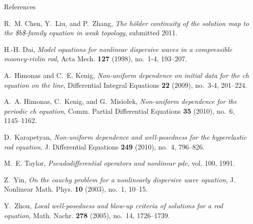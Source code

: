 \documentclass{beamer}
\numberwithin{equation}{section}
\begin{document}





\providecommand{\bysame}{\leavevmode\hbox to3em{\hrulefill}\thinspace}
\providecommand{\MR}{\relax\ifhmode\unskip\space\fi MR }
\providecommand{\MRhref}[2]{%
  \href{http://www.ams.org/mathscinet-getitem?mr=#1}{#2}
}
\providecommand{\href}[2]{#2}
\begin{frame}[allowframebreaks]{References} 
\begin{thebibliography}{HKM10}

R.~M. Chen, Y.~Liu, and P.~Zhang, \emph{The h{\"o}lder continuity of the
  solution map to the {\$}b{\$}-family equation in weak topology}, submitted 2011.

H.-H. Dai, \emph{Model equations for nonlinear dispersive waves in a
  compressible mooney-rivlin rod}, Acta Mech. \textbf{127} (1998), no.~1-4,
  193--207.

A.~Himonas and C.~E. Kenig, \emph{Non-uniform dependence on initial data for
  the ch equation on the line}, Differential Integral Equations \textbf{22}
  (2009), no.~3-4, 201--224.

A.~A. Himonas, C.~Kenig, and G.~Misio{\l}ek, \emph{Non-uniform dependence for
  the periodic ch equation}, Comm. Partial Differential Equations \textbf{35}
  (2010), no.~6, 1145--1162.

D.~Karapetyan, \emph{Non-uniform dependence and well-posedness for the
  hyperelastic rod equation}, J. Differential Equations \textbf{249} (2010),
  no.~4, 796--826.

M.~E. Taylor, \emph{Pseudodifferential operators and nonlinear pde}, vol. 100,
  1991.

Z.~Yin, \emph{On the cauchy problem for a nonlinearly dispersive wave
  equation}, J. Nonlinear Math. Phys. \textbf{10} (2003), no.~1, 10--15.

Y.~Zhou, \emph{Local well-posedness and blow-up criteria of solutions for a rod
  equation}, Math. Nachr. \textbf{278} (2005), no.~14, 1726--1739.

\end{thebibliography}

\end{frame} 

%
%
\end{document}

